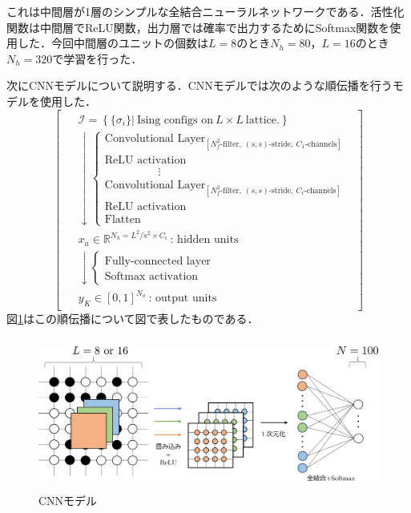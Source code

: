 \documentclass[a4paper,11pt]{jsreport}
\begin{document}
これは中間層が1層のシンプルな全結合ニューラルネットワークである．活性化関数は中間層でReLU関数，出力層では確率で出力するためにSoftmax関数を使用した．今回中間層のユニットの個数は$L=8$のとき$N_h=80$，$L=16$のとき$N_h=320$で学習を行った．\par
次にCNNモデルについて説明する．CNNモデルでは次のような順伝播を行うモデルを使用した．
\begin{equation}
  \begin{bmatrix}
    \begin{aligned}
       & \mathcal{I} = \left\{ \{ \sigma_i \} \Big| \ \text{Ising configs on} \ L \times L \ \text{lattice.} \right\} \\
       & \downarrow
      \begin{cases}
        \text{Convolutional Layer}_{[N_f^2\text{-filter}, \ (s,s)\text{-stride}, \ C_1\text{-channels}]} \\
        \text{ReLU activation} \\
        \hspace{2cm} \vdots \\
        \text{Convolutional Layer}_{[N_f^2\text{-filter}, \ (s,s)\text{-stride}, \ C_i\text{-channels}]} \\
        \text{ReLU activation} \\
        \text{Flatten}
      \end{cases} \\
       & x_a \in \mathbb{R}^{N_h = L^2/s^2 \times C_i} \ \text{: hidden units} \\
       & \downarrow
      \begin{cases}
        \text{Fully-connected layer} \\
        \text{Softmax activation}
      \end{cases} \\
       & y_K \in [0,1]^{N_o} \ \text{: output units}
    \end{aligned}
  \end{bmatrix}
\end{equation}
図\ref{温度測定器CNNモデル}はこの順伝播について図で表したものである．
\begin{figure}[H]
  \begin{center}
    \includegraphics[height=5cm]{image/温度測定器CNN.png}
    \caption{CNNモデル}
    \label{温度測定器CNNモデル}
  \end{center}
\end{figure}
\end{document}
